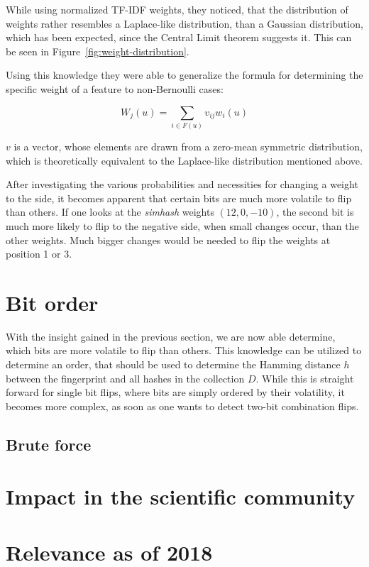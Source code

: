 \documentclass[12pt,a4paper,DIV=calc]{scrartcl}
\begin{document}
While using normalized TF-IDF weights, they noticed, that the distribution of weights rather resembles a Laplace-like distribution, than a Gaussian distribution, which has been expected, since the Central Limit theorem suggests it.
This can be seen in Figure~\ref{fig:weight-distribution}.

Using this knowledge they were able to generalize the formula for determining the specific weight of a feature to non-Bernoulli cases:

\[W_j(u) = \sum_{i \in F(u)} v_{ij}w_i(u)\]

$v$ is a vector, whose elements are drawn from a zero-mean symmetric distribution, which is theoretically equivalent to the Laplace-like distribution mentioned above.

After investigating the various probabilities and necessities for changing a weight to the side, it becomes apparent that certain bits are much more volatile to flip than others.
If one looks at the \emph{simhash} weights $(12, 0, -10)$, the second bit is much more likely to flip to the negative side, when small changes occur, than the other weights.
Much bigger changes would be needed to flip the weights at position 1 or 3.


\section{Bit order}

With the insight gained in the previous section, we are now able determine, which bits are more volatile to flip than others.
This knowledge can be utilized to determine an order, that should be used to determine the Hamming distance $h$ between the fingerprint and all hashes in the collection $D$.
While this is straight forward for single bit flips, where bits are simply ordered by their volatility, it becomes more complex, as soon as one wants to detect two-bit combination flips.

\subsection{Brute force}




\section{Impact in the scientific community}


\section{Relevance as of 2018}


\printbibliography
\end{document}
